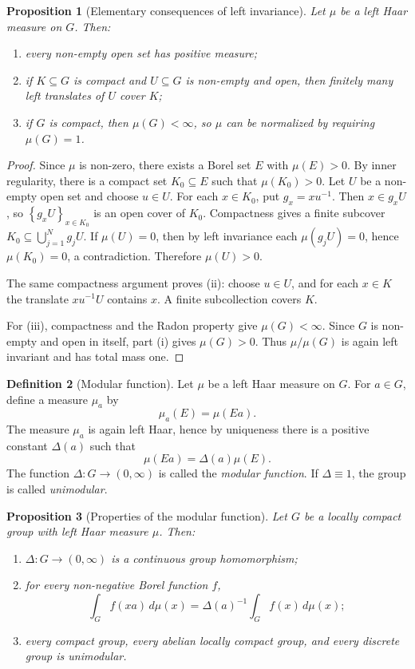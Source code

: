 \documentclass[11pt,openany]{book}
\numberwithin{equation}{chapter}
\theoremstyle{definition}
\newtheorem{definition}{Definition}[chapter]
\theoremstyle{plain}
\newtheorem{proposition}[definition]{Proposition}
\theoremstyle{remark}
\newcommand{\1}{\mathbf{1}}
\newcommand{\dd}{\,d}
\newcommand{\set}[1]{\left\{#1\right\}}
\begin{document}
\begin{proposition}[Elementary consequences of left invariance]
Let \(\mu\) be a left Haar measure on \(G\). Then:
\begin{enumerate}[label=\textup{(\roman*)}]
  \item every non-empty open set has positive measure;
  \item if \(K\subseteq G\) is compact and \(U\subseteq G\) is non-empty and open, then finitely many left translates of \(U\) cover \(K\);
  \item if \(G\) is compact, then \(\mu(G)<\infty\), so \(\mu\) can be normalized by requiring \(\mu(G)=1\).
\end{enumerate}
\end{proposition}

\begin{proof}
Since \(\mu\) is non-zero, there exists a Borel set \(E\) with \(\mu(E)>0\). By inner regularity, there is a compact set \(K_0\subseteq E\) such that \(\mu(K_0)>0\). Let \(U\) be a non-empty open set and choose \(u\in U\). For each \(x\in K_0\), put \(g_x=xu^{-1}\). Then \(x\in g_xU\), so \(\set{g_xU}_{x\in K_0}\) is an open cover of \(K_0\). Compactness gives a finite subcover \(K_0\subseteq\bigcup_{j=1}^Ng_jU\). If \(\mu(U)=0\), then by left invariance each \(\mu(g_jU)=0\), hence \(\mu(K_0)=0\), a contradiction. Therefore \(\mu(U)>0\).

The same compactness argument proves (ii): choose \(u\in U\), and for each \(x\in K\) the translate \(xu^{-1}U\) contains \(x\). A finite subcollection covers \(K\).

For (iii), compactness and the Radon property give \(\mu(G)<\infty\). Since \(G\) is non-empty and open in itself, part (i) gives \(\mu(G)>0\). Thus \(\mu/\mu(G)\) is again left invariant and has total mass one.
\end{proof}

\begin{definition}[Modular function]
Let \(\mu\) be a left Haar measure on \(G\). For \(a\in G\), define a measure \(\mu_a\) by
\[
  \mu_a(E)=\mu(Ea).
\]
The measure \(\mu_a\) is again left Haar, hence by uniqueness there is a positive constant \(\Delta(a)\) such that
\[
  \mu(Ea)=\Delta(a)\mu(E).
\]
The function \(\Delta:G\to(0,\infty)\) is called the \emph{modular function}. If \(\Delta\equiv1\), the group is called \emph{unimodular}.
\end{definition}

\begin{proposition}[Properties of the modular function]
Let \(G\) be a locally compact group with left Haar measure \(\mu\). Then:
\begin{enumerate}[label=\textup{(\roman*)}]
  \item \(\Delta:G\to(0,\infty)\) is a continuous group homomorphism;
  \item for every non-negative Borel function \(f\),
  \[
    \int_G f(xa)\dd\mu(x)=\Delta(a)^{-1}\int_G f(x)\dd\mu(x);
  \]
  \item every compact group, every abelian locally compact group, and every discrete group is unimodular.
\end{enumerate}
\end{proposition}
\end{document}
